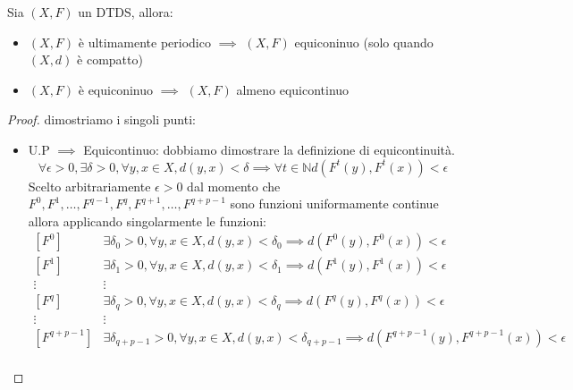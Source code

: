 \begin{teorema}
    Sia $(X,F)$ un DTDS, allora:
    \begin{itemize}
        \item $(X,F)$ è ultimamente periodico $\implies$ $(X,F)$ equiconinuo (solo quando $(X,d)$ è compatto)
        \item $(X,F)$ è equiconinuo $\implies$ $(X,F)$ almeno equicontinuo
    \end{itemize}
    \begin{proof}
        dimostriamo i singoli punti:
        \begin{itemize}
            \item U.P $\implies$ Equicontinuo: dobbiamo dimostrare la definizione
                  di equicontinuità.
                  $$\forall \epsilon > 0,\exists \delta > 0, \forall y, x\in X, d(y,x) < \delta \implies \forall t\in \mathbb{N} d(F^t(y),F^t(x))< \epsilon$$
                  Scelto arbitrariamente $\epsilon>0$ dal momento che $F^0, F^{1}, \dots, F^{q-1},F^{q},F^{q+1},\dots,F^{q+p-1}$
                  sono funzioni uniformamente continue allora applicando singolarmente le funzioni:
                  \begin{equation*}
                      \begin{array}{cl}
                          \left[F^0\right]       & \exists \delta_0 > 0, \forall y, x\in X, d(y,x) < \delta_0 \implies d(F^0(y),F^0(x))< \epsilon                         \\
                          \left[F^1\right]       & \exists \delta_1 > 0, \forall y, x\in X, d(y,x) < \delta_1 \implies d(F^1(y),F^1(x))< \epsilon                         \\
                          \vdots                 & \vdots                                                                                                                 \\
                          \left[F^q\right]       & \exists \delta_q > 0, \forall y, x\in X, d(y,x) < \delta_q \implies d(F^q(y),F^q(x))< \epsilon                         \\
                          \vdots                 & \vdots                                                                                                                 \\
                          \left[F^{q+p-1}\right] & \exists \delta_{q+p-1} > 0, \forall y, x\in X, d(y,x) < \delta_{q+p-1} \implies d(F^{q+p-1}(y),F^{q+p-1}(x))< \epsilon \\

\end{array}
\end{equation*}
\end{itemize}
\end{proof}
\end{teorema}
